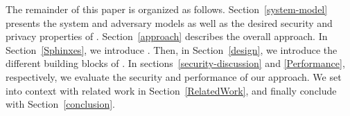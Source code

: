 The remainder of this paper is organized as follows. Section~\ref{system-model} presents the
system and adversary models as well as the desired security and
privacy properties of \name. Section~\ref{approach} describes the
overall approach. In Section~\ref{Sphinxes}, we introduce \sphinxes. 
Then, in Section~\ref{design}, we introduce the different building
blocks of \name. In sections~\ref{security-discussion} and \ref{Performance},
respectively, we evaluate the security and performance of our
approach. We set \name into context with related work in
Section~\ref{RelatedWork}, and finally conclude with Section~\ref{conclusion}.

